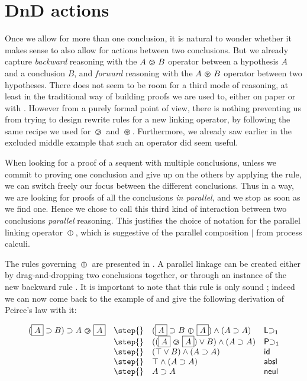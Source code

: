 \section{DnD actions}

Once we allow for more than one conclusion, it is natural to wonder whether it
makes sense to also allow for  actions between two conclusions. But we
already capture \emph{backward} reasoning with the $A \operatorname{\,\varogreaterthan\,} B$ operator between
a hypothesis $A$ and a conclusion $B$, and \emph{forward} reasoning with the $A
\operatorname{\,\varoast\,} B$ operator between two hypotheses. There does not seem to be room for a
third mode of reasoning, at least in the traditional way of building proofs we
are used to, either on paper or with . However from a purely
formal point of view, there is nothing preventing us from trying to design
rewrite rules for a new linking operator, by following the same recipe we used
for $\operatorname{\,\varogreaterthan\,}$ and $\operatorname{\,\varoast\,}$. Furthermore, we already saw earlier in the excluded
middle example that such an operator did seem useful.

When looking for a proof of a sequent with multiple conclusions, unless we
commit to proving one conclusion and give up on the others by applying the
{} rule, we can switch freely our focus between the different
conclusions. Thus in a way, we are looking for proofs of all the conclusions
\emph{in parallel}, and we stop as soon as we find one. Hence we chose to
call this third kind of interaction between two conclusions \emph{parallel}
reasoning. This justifies the choice of notation for the parallel linking
operator $\operatorname{\,\varobar\,}$, which is suggestive of the parallel composition $\mid$ from
process calculi.

The rules governing $\operatorname{\,\varobar\,}$ are presented in . A parallel
linkage can be created either by drag-and-dropping two conclusions together, or
through an instance of the new backward rule {}. It is
important to note that this rule is only sound \emph{}; indeed we can
now come back to the example of  and give the following
derivation of Peirce's law with it:

$$
\begin{array}{llll}
  (\select{A} \limp B) \limp A \back \select{A}
  &\step{}& (\select{A} \limp B \para \select{A}) \land (A \limp A) &\mathsf{L{\limp}_1} \\
  &\step{}& ((\select{A} \back \select{A}) \lor B) \land (A \limp A) &\mathsf{P{\limp}_1} \\
  &\step{}& (\top \lor B) \land (A \limp A) &\mathsf{id} \\
  &\step{}& \top \land (A \limp A) &\mathsf{absl} \\
  &\step{}& A \limp A &\mathsf{neul}
\end{array}
$$


